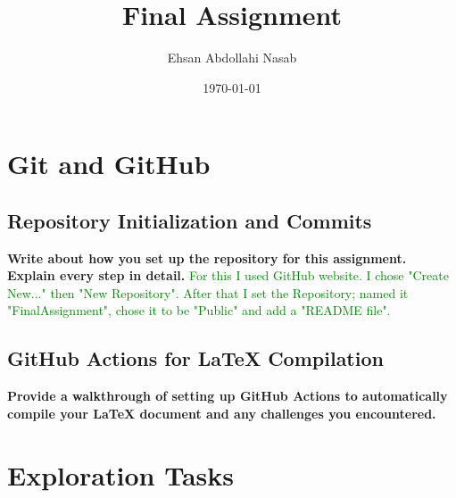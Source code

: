 \documentclass{article}
\title{Final Assignment}
\author{Ehsan Abdollahi Nasab}
\date{\today}
\begin{document}
\maketitle

\section{Git and GitHub}
\subsection{Repository Initialization and Commits}
\textbf{Write about how you set up the repository for this assignment. Explain every step in detail.}
\textcolor{green}{
    For this I used GitHub website. I chose "Create New..." then "New Repository". After that I set the Repository; named it "FinalAssignment", chose it to be "Public" and add a "README file".}
\subsection{GitHub Actions for LaTeX Compilation}
\textbf{Provide a walkthrough of setting up GitHub Actions to automatically compile your LaTeX document and any challenges you encountered.}
\textcolor{green}{}

\section{Exploration Tasks}
\end{document}
